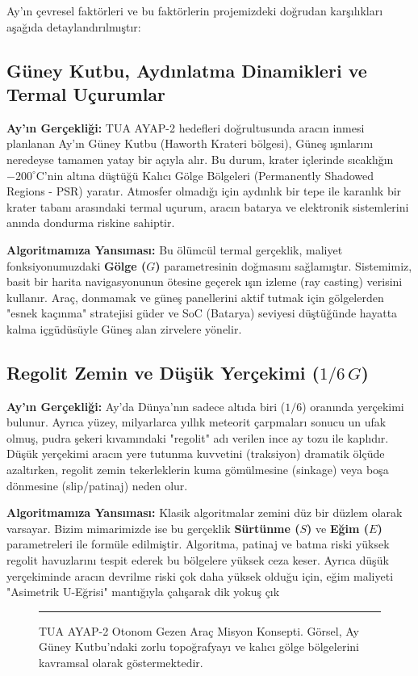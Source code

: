 \documentclass[12pt,a4paper]{article}
\begin{document}
Ay'ın çevresel faktörleri ve bu faktörlerin projemizdeki doğrudan karşılıkları aşağıda detaylandırılmıştır:

\subsection{Güney Kutbu, Aydınlatma Dinamikleri ve Termal Uçurumlar}
\textbf{Ay'ın Gerçekliği:} TUA AYAP-2 hedefleri doğrultusunda aracın inmesi planlanan Ay'ın Güney Kutbu (Haworth Krateri bölgesi), Güneş ışınlarını neredeyse tamamen yatay bir açıyla alır. Bu durum, krater içlerinde sıcaklığın $-200^\circ\text{C}$'nin altına düştüğü Kalıcı Gölge Bölgeleri (Permanently Shadowed Regions - PSR) yaratır. Atmosfer olmadığı için aydınlık bir tepe ile karanlık bir krater tabanı arasındaki termal uçurum, aracın batarya ve elektronik sistemlerini anında dondurma riskine sahiptir.

\textbf{Algoritmamıza Yansıması:} Bu ölümcül termal gerçeklik, maliyet fonksiyonumuzdaki \textbf{Gölge ($G$)} parametresinin doğmasını sağlamıştır. Sistemimiz, basit bir harita navigasyonunun ötesine geçerek ışın izleme (ray casting) verisini kullanır. Araç, donmamak ve güneş panellerini aktif tutmak için gölgelerden "esnek kaçınma" stratejisi güder ve SoC (Batarya) seviyesi düştüğünde hayatta kalma içgüdüsüyle Güneş alan zirvelere yönelir.

\subsection{Regolit Zemin ve Düşük Yerçekimi ($1/6\,G$)}
\textbf{Ay'ın Gerçekliği:} Ay'da Dünya'nın sadece altıda biri ($1/6$) oranında yerçekimi bulunur. Ayrıca yüzey, milyarlarca yıllık meteorit çarpmaları sonucu un ufak olmuş, pudra şekeri kıvamındaki "regolit" adı verilen ince ay tozu ile kaplıdır. Düşük yerçekimi aracın yere tutunma kuvvetini (traksiyon) dramatik ölçüde azaltırken, regolit zemin tekerleklerin kuma gömülmesine (sinkage) veya boşa dönmesine (slip/patinaj) neden olur.

\textbf{Algoritmamıza Yansıması:} Klasik algoritmalar zemini düz bir düzlem olarak varsayar. Bizim mimarimizde ise bu gerçeklik \textbf{Sürtünme ($S$)} ve \textbf{Eğim ($E$)} parametreleri ile formüle edilmiştir. Algoritma, patinaj ve batma riski yüksek regolit havuzlarını tespit ederek bu bölgelere yüksek ceza keser. Ayrıca düşük yerçekiminde aracın devrilme riski çok daha yüksek olduğu için, eğim maliyeti "Asimetrik U-Eğrisi" mantığıyla çalışarak dik yokuş çık
\begin{figure}[h]
    \centering
    \rule{\textwidth}{6cm}
    \caption{TUA AYAP-2 Otonom Gezen Araç Misyon Konsepti. Görsel, Ay Güney Kutbu’ndaki zorlu topoğrafyayı ve kalıcı gölge bölgelerini kavramsal olarak göstermektedir.}
    \label{fig:gorev_konsepti}
\end{figure}
\end{document}
